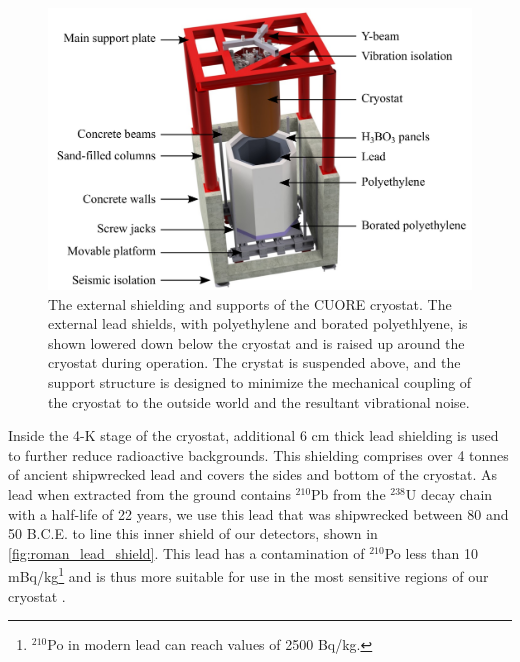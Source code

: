 \begin{figure}
    \centering
    \includegraphics[width=\linewidth]{Figures/Hut_ShieldingDown_02.pdf}
    \caption[The external shielding and supports of the CUORE cryostat.]
    {The external shielding and supports of the CUORE cryostat.
    The external lead shields, with polyethylene and borated polyethlyene, is shown lowered down below the cryostat and is raised up around the cryostat during operation.
    The crystat is suspended above, and the support structure is designed to minimize the mechanical coupling of the cryostat to the outside world and the resultant vibrational noise.}
    \label{fig:external_shielding}
\end{figure}
Inside the 4-K stage of the cryostat, additional 6 cm thick lead shielding is used to further reduce radioactive backgrounds. This shielding comprises over 4 tonnes of ancient shipwrecked lead \cite{roman_lead} and covers the sides and bottom of the cryostat.
As lead when extracted from the ground contains $^{210}$Pb from the $^{238}$U decay chain with a half-life of 22 years, we use this lead that was shipwrecked between 80 and 50 B.C.E. to line this inner shield of our detectors, shown in \autoref{fig:roman_lead_shield}.
This lead has a contamination of $^{210}$Po less than 10 mBq/kg\footnote{$^{210}$Po in modern lead can reach values of 2500 Bq/kg.} and is thus more suitable for use in the most sensitive regions of our cryostat \cite{ALESSANDRELLO1998163}.  
